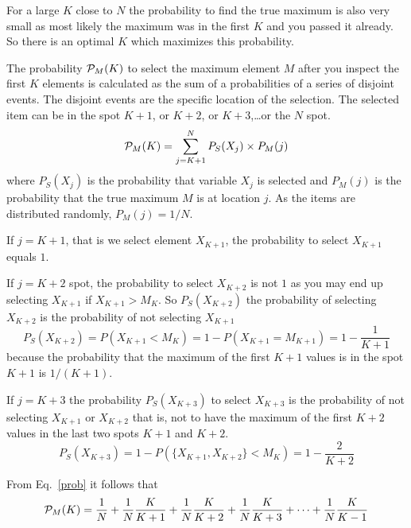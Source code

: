 \documentclass[preprint]{revtex4}
\begin{document}

For a large $K$ close to $N$ the probability to find the true maximum
is also very small as most likely the maximum was in the first $K$ and
you passed it already.  So there is an optimal $K$ which maximizes
this probability.

The probability ${\cal P}_M(K)$ to select the maximum element $M$ after
you inspect the first $K$ elements is calculated as the sum of a 
probabilities of a series of disjoint events.  The disjoint events are
the specific location of the selection.  The selected item can be in
the spot $K+1$, or $K+2$, or $K+3$,\ldots or the $N$ spot. 
\begin{equation}
  \label{prob}
  {\cal P}_M(K) = \sum_{j=K+1}^{N} P_S(X_j) \times P_M(j)
\end{equation}
where $P_S(X_j)$ is the probability that variable $X_j$ is selected and
$P_M(j)$ is the probability that the true maximum $M$ is at location $j$.
As the items are distributed randomly, $P_M(j)=1/N$.

If $j=K+1$, that is we select element $X_{K+1}$, the probability to
select $X_{K+1}$ equals $1$.

If $j=K+2$ spot, the probability to select $X_{K+2}$ is not $1$ as you
may end up selecting $X_{K+1}$ if $X_{K+1}>M_K$.  So $P_S(X_{K+2})$
the probability of selecting $X_{K+2}$ is the probability of not
selecting $X_{K+1}$
$$P_S(X_{K+2}) = P(X_{K+1} < M_K) = 1-P(X_{K+1}=M_{K+1}) =
1 - \frac{1}{K+1}$$
because the probability that the maximum of the first $K+1$ values is
in the spot $K+1$ is $1/(K+1)$.

If $j=K+3$ the probability $P_S(X_{K+3})$ to select $X_{K+3}$ is the
probability of not selecting $X_{K+1}$ or $X_{K+2}$ that is, not to have
the maximum of the first $K+2$ values in the last two spots $K+1$ and
$K+2$.
$$P_S(X_{K+3}) = 1-P(\{X_{K+1}, X_{K+2}\}<M_K) = 1 - \frac{2}{K+2}$$ 

From Eq.\ \ref{prob} it follows that
\begin{equation}
  {\cal P}_M(K) = \frac{1}{N} + \frac{1}{N}\frac{K}{K+1}
  + \frac{1}{N}\frac{K}{K+2} 
  + \frac{1}{N}\frac{K}{K+3} 
  + \cdots + \frac{1}{N}\frac{K}{K-1} 
\end{equation}



\begin{equation}
\end{equation}
\end{document}
